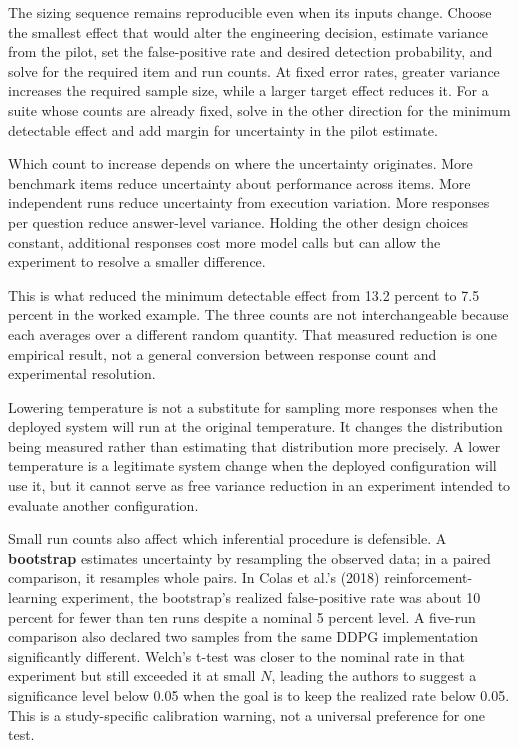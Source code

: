The sizing sequence remains reproducible even when its inputs change. Choose the smallest effect that would alter the engineering decision, estimate variance from the pilot, set the false-positive rate and desired detection probability, and solve for the required item and run counts. At fixed error rates, greater variance increases the required sample size, while a larger target effect reduces it. For a suite whose counts are already fixed, solve in the other direction for the minimum detectable effect and add margin for uncertainty in the pilot estimate.

Which count to increase depends on where the uncertainty originates. More benchmark items reduce uncertainty about performance across items. More independent runs reduce uncertainty from execution variation. More responses per question reduce answer-level variance. Holding the other design choices constant, additional responses cost more model calls but can allow the experiment to resolve a smaller difference.

This is what reduced the minimum detectable effect from 13.2 percent to 7.5 percent in the worked example. The three counts are not interchangeable because each averages over a different random quantity. That measured reduction is one empirical result, not a general conversion between response count and experimental resolution.

Lowering temperature is not a substitute for sampling more responses when the deployed system will run at the original temperature. It changes the distribution being measured rather than estimating that distribution more precisely. A lower temperature is a legitimate system change when the deployed configuration will use it, but it cannot serve as free variance reduction in an experiment intended to evaluate another configuration.

Small run counts also affect which inferential procedure is defensible. A \textbf{bootstrap} estimates uncertainty by resampling the observed data; in a paired comparison, it resamples whole pairs. In Colas et al.'s (2018) reinforcement-learning experiment, the bootstrap's realized false-positive rate was about 10 percent for fewer than ten runs despite a nominal 5 percent level. A five-run comparison also declared two samples from the same DDPG implementation significantly different. Welch's t-test was closer to the nominal rate in that experiment but still exceeded it at small \(N\), leading the authors to suggest a significance level below 0.05 when the goal is to keep the realized rate below 0.05. This is a study-specific calibration warning, not a universal preference for one test.

